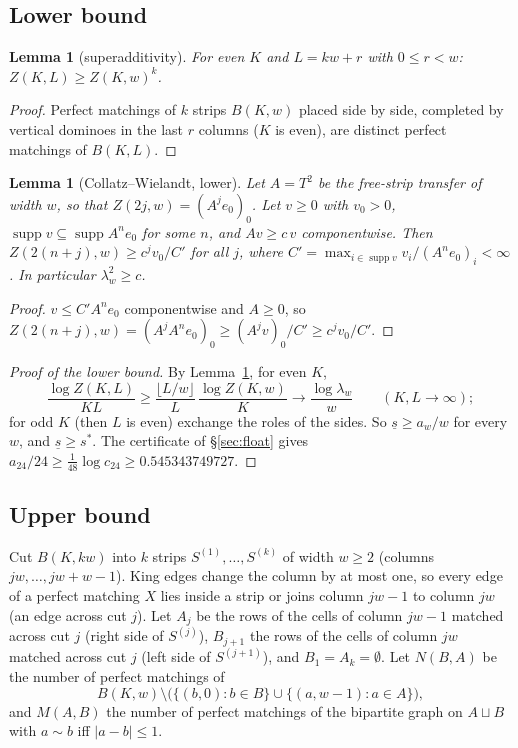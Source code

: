 \documentclass[11pt]{amsart}
\newtheorem{lemma}[theorem]{Lemma}
\theoremstyle{definition}
\theoremstyle{remark}
\newcommand{\supp}{\operatorname{supp}}
\begin{document}
\subsection{Lower bound}

\begin{lemma}[superadditivity]\label{lem:super}
For even $K$ and $L = kw + r$ with $0 \le r < w$: $Z(K, L) \ge Z(K, w)^k$.
\end{lemma}
\begin{proof}
Perfect matchings of $k$ strips $B(K, w)$ placed side by side, completed by vertical dominoes in
the last $r$ columns ($K$ is even), are distinct perfect matchings of $B(K, L)$.
\end{proof}

\begin{lemma}[Collatz--Wielandt, lower]\label{lem:cwlow}
Let $A = T^2$ be the free-strip transfer of width $w$, so that $Z(2j, w) = (A^j e_0)_0$. Let
$v \ge 0$ with $v_0 > 0$, $\supp v \subseteq \supp A^n e_0$ for some $n$, and $Av \ge c\,v$
componentwise. Then $Z(2(n + j), w) \ge c^j v_0 / C'$ for all $j$, where
$C' = \max_{i \in \supp v} v_i / (A^n e_0)_i < \infty$. In particular $\lambda_w^2 \ge c$.
\end{lemma}
\begin{proof}
$v \le C' A^n e_0$ componentwise and $A \ge 0$, so
$Z(2(n+j), w) = (A^j A^n e_0)_0 \ge (A^j v)_0 / C' \ge c^j v_0 / C'$.
\end{proof}

\begin{proof}[Proof of the lower bound]
By Lemma~\ref{lem:super}, for even $K$,
\[
  \frac{\log Z(K, L)}{KL} \ge \frac{\lfloor L/w\rfloor}{L}\,\frac{\log Z(K, w)}{K}
  \longrightarrow \frac{\log\lambda_w}{w} \qquad (K, L \to \infty);
\]
for odd $K$ (then $L$ is even) exchange the roles of the sides. So $\underline s \ge a_w / w$ for every $w$, and
$\underline s \ge s^*$. The certificate of \S\ref{sec:float} gives
$a_{24}/24 \ge \frac{1}{48}\log c_{24} \ge 0.545343749727$.
\end{proof}

\subsection{Upper bound}
Cut $B(K, kw)$ into $k$ strips $S^{(1)}, \dots, S^{(k)}$ of width $w \ge 2$ (columns
$jw, \dots, jw + w - 1$). King edges change the column by at most one, so every edge of a perfect
matching $X$ lies inside a strip or joins column $jw - 1$ to column $jw$ (an edge across cut $j$).
Let $A_j$ be the rows of the cells of column $jw - 1$ matched across cut $j$ (right side of
$S^{(j)}$), $B_{j+1}$ the rows of the cells of column $jw$ matched across cut $j$ (left side of
$S^{(j+1)}$), and $B_1 = A_k = \emptyset$. Let $N(B, A)$ be the number of perfect matchings of
\[
  B(K, w) \setminus \bigl(\{(b, 0) : b \in B\} \cup \{(a, w-1) : a \in A\}\bigr),
\]
and $M(A, B)$ the number of perfect matchings of the bipartite graph on $A \sqcup B$ with
$a \sim b$ iff $|a - b| \le 1$.
\end{document}
